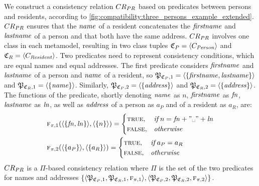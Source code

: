 \begin{example}
We construct a consistency relation $\consistencyrelation{CR}{PR}$ based on predicates between persons and residents, according to \autoref{fig:compatibility:three_persons_example_extended}. 
$\consistencyrelation{CR}{PR}$ ensures that the $\mathit{name}$ of a resident concatenates the $\mathit{firstname}$ and $\mathit{lastname}$ of a person and that both have the same address. 
$\consistencyrelation{CR}{PR}$ involves one class in each metamodel, resulting in two class tuples $\classtuple{C}{P} = \tupled{\class{C}{\mathvariable{Person}}}$ and $\classtuple{C}{R} = \tupled{\class{c}{\mathvariable{Resident}}}$. 
Two predicates need to represent consistency conditions, which are equal names and equal addresses.
The first predicate considers $\mathit{firstname}$ and $\mathit{lastname}$ of a person and $\mathit{name}$ of a resident, so $\propertysettuple{P}{\classtuple{C}{P}, 1} = \tupled{\setted{\mathvariable{firstname}, \mathvariable{lastname}}}$ and $\propertysettuple{P}{\classtuple{C}{R}, 1} = \tupled{\setted{\mathvariable{name}}}$. 
Similarly, $\propertysettuple{P}{\classtuple{C}{P}, 2} = \tupled{\setted{\mathvariable{address}}}$ and $\propertysettuple{P}{\classtuple{C}{R}, 2} = \tupled{\setted{\mathvariable{address}}}$.
The functions of the predicate, shortly denoting $\mathit{name}$ as $n$, $\mathit{firstname}$ as $\mathit{fn}$, $\mathit{lastname}$ as $\mathit{ln}$, as well as $\mathit{address}$ of a person as $a_P$ and of a resident as $a_R$, are:
\begin{align*}
   &
   \function{f}_{\pi, 1}(\tupled{\setted{\mathvariable{fn}, \mathvariable{ln}}}, \tupled{\setted{n}}) = 
   \begin{cases} 
      \truemath, & \ifmath n = \mathvariable{fn} + "\text{\textvisiblespace}" + \mathvariable{ln} \\
      \falsemath, & \otherwisemath
   \end{cases} \\
   &
   \function{f}_{\pi, 2}(\tupled{\setted{a_P}}, \tupled{\setted{a_R}}) = \begin{cases} 
      \truemath, & \ifmath a_P = a_R \\
      \falsemath, & \otherwisemath
   \end{cases}
\end{align*}
$\consistencyrelation{CR}{PR}$ is a $\Pi$-based consistency relation where $\Pi$ is the set of the two predicates for names and addresses $\setted{\tupled{\propertysettuple{P}{\classtuple{C}{P}, 1}, \propertysettuple{P}{\classtuple{C}{R}, 1},\function{f}_{\pi, 1}}, \tupled{\propertysettuple{P}{\classtuple{C}{P}, 2}, \propertysettuple{P}{\classtuple{C}{R}, 2}, \function{f}_{\pi, 2}}}$.
\end{example}

